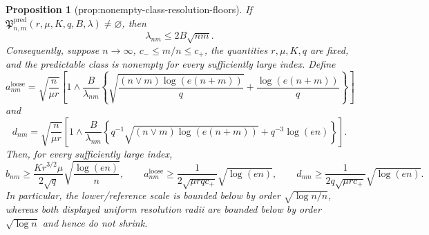\documentclass{article}
\newtheorem{proposition}{Proposition}
\begin{document}
\begin{proposition}[prop:nonempty-class-resolution-floors]\label{prop:nonempty-class-resolution-floors}
If
\(\mathfrak P^{\mathrm{pred}}_{n,m}(r,\mu,K,q,B,\lambda)\ne\varnothing\),
then
\[
 \lambda_{nm}\le 2B\sqrt{nm}.
\]
Consequently, suppose \(n\to\infty\),
\(c_-\le m/n\le c_+\), the quantities \(r,\mu,K,q\) are fixed, and
the predictable class is nonempty for every sufficiently large index.  Define
\[
 a^{\mathrm{loose}}_{nm}=\sqrt{\frac n{\mu r}}
 \left[1\wedge\frac B{\lambda_{nm}}
 \left\{\sqrt{\frac{(n\vee m)\log(e(n+m))}{q}}
 +\frac{\log(e(n+m))}{q}\right\}\right]
\]
and
\[
 d_{nm}=\sqrt{\frac n{\mu r}}
 \left[1\wedge\frac B{\lambda_{nm}}
 \left\{q^{-1}\sqrt{(n\vee m)\log(e(n+m))}
 +q^{-3}\log(en)\right\}\right].
\]
Then, for every sufficiently large index,
\[
 b_{nm}\ge
 \frac{K r^{3/2}\mu}{2\sqrt q}\sqrt{\frac{\log(en)}n},
 \qquad
 a^{\mathrm{loose}}_{nm}\ge
 \frac{1}{2\sqrt{\mu r q c_+}}\sqrt{\log(en)},
 \qquad
 d_{nm}\ge
 \frac{1}{2q\sqrt{\mu r c_+}}\sqrt{\log(en)}.
\]
In particular, the lower/reference scale is bounded below by order
\(\sqrt{\log n/n}\), whereas both displayed uniform resolution radii are
bounded below by order \(\sqrt{\log n}\) and hence do not shrink.
\end{proposition}
\end{document}

